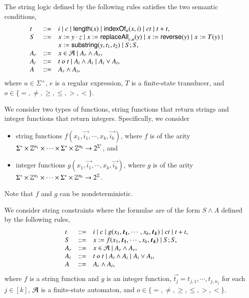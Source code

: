 \documentclass{llncs}
\begin{document}
The string logic {\cslint} defined by the following rules satisfies the two semantic conditions,
\[
\begin{array}{l c l}
t  &::=& i \mid c \mid \mathsf{length}(x) \mid \mathsf{indexOf}_u(x, i) \mid  ct  \mid t + t,   \\
S &::= &  x:= y \cdot z \mid x:= \mathsf{replaceAll}_{e,u}(y) \mid   x:=\mathsf{reverse}(y) \mid x:=T(y) \mid \\
& & x := \mathsf{substring}(y, t_1, t_2)  \mid S;S, \\
A_r & ::= & x \in \mathcal{A} \mid A_r \wedge A_r,\\
A_i & ::= & t\ o\ t \mid A_i \wedge A_i  \mid A_i \vee A_i,\\
A & ::= &   A_r \wedge A_i,
\end{array}
\]
where  $u \in \Sigma^+$, $e$ is a regular expression, $T$ is a finite-state transducer, and $o \in \{=, \neq, \ge, \le, >, <\}$.



We consider two types of functions, string functions that return strings and integer functions that return integers. Specifically, we consider 
\begin{itemize}
\item string functions $f(x_1, \vec{i_1}, \cdots, x_k, \vec{i_k})$, where $f$ is of the arity $\Sigma^* \times \mathbb{Z}^{n_1} \times \cdots \times \Sigma^* \times \mathbb{Z}^{n_k} \rightarrow 2^{\Sigma^*}$, and
\item  integer functions $g(x_1, \vec{i_1}, \cdots, x_k, \vec{i_k})$, where $g$ is of the arity $\Sigma^* \times \mathbb{Z}^{n_1} \times \cdots \times \Sigma^* \times \mathbb{Z}^{n_k} \rightarrow 2^{\mathbb{Z}}$.
\end{itemize} 
Note that $f$ and $g$ can be nondeterministic.

We consider string constraints where the formulae are of the form $S \wedge A$ defined by the following rules,
\[
\begin{array}{l c l}
t  &::=& i \mid c \mid  g(x_1, \vec{t_1}, \cdots, x_k, \vec{t_k}) \mid ct \mid t + t,   \\
S &::= &  x:=f(x_1, \vec{t_1}, \cdots, x_k, \vec{t_k}) \mid S;S, \\
A_r & ::= & x \in \Aut  \mid A_r \wedge A_r, \\
A_i & ::= & t\ o\ t \mid A_i \wedge A_i \mid A_i \vee A_i,\\
A & ::= &   A_r \wedge A_i, 
\end{array}
\]
where $f$ is a string function and $g$ is an integer function, $\vec{t_j} = t_{j,1}, \cdots, t_{j, n_j}$ for each $j \in [k]$, $\mathcal{A}$ is a finite-state automaton, and $o \in \{=, \neq, \ge, \le, >, <\}$.
\end{document}

